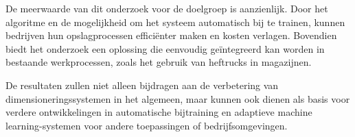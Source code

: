 De meerwaarde van dit onderzoek voor de doelgroep is aanzienlijk. Door het algoritme en de mogelijkheid om het systeem automatisch bij te trainen, kunnen bedrijven hun opslagprocessen efficiënter maken en kosten verlagen. Bovendien biedt het onderzoek een oplossing die eenvoudig geïntegreerd kan worden in bestaande werkprocessen, zoals het gebruik van heftrucks in magazijnen. 

De resultaten zullen niet alleen bijdragen aan de verbetering van dimensioneringssystemen in het algemeen, maar kunnen ook dienen als basis voor verdere ontwikkelingen in automatische bijtraining en adaptieve machine learning-systemen voor andere toepassingen of bedrijfsomgevingen.

